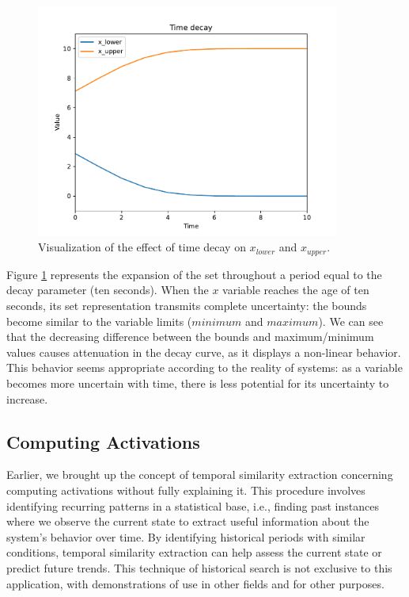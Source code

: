 \begin{figure}[h!]
    \centering
    \includegraphics[width=10cm]{figures/chapter4/cell/time_decay.pdf}
    \caption{Visualization of the effect of time decay on $x_{lower}$ and $x_{upper}$.}
    \label{fig:timedecay}
\end{figure}

Figure \ref{fig:timedecay} represents the expansion of the set throughout a period equal to the decay parameter (ten seconds). When the $x$ variable reaches the age of ten seconds, its set representation transmits complete uncertainty: the bounds become similar to the variable limits ($minimum$ and $maximum$). We can see that the decreasing difference between the bounds and maximum/minimum values causes attenuation in the decay curve, as it displays a non-linear behavior. This behavior seems appropriate according to the reality of systems: as a variable becomes more uncertain with time, there is less potential for its uncertainty to increase.


\subsection{Computing Activations} \label{subsec:tempsim}

Earlier, we brought up the concept of temporal similarity extraction concerning computing activations without fully explaining it. This procedure involves identifying recurring patterns in a statistical base, i.e., finding past instances where we observe the current state to extract useful information about the system's behavior over time. By identifying historical periods with similar conditions, temporal similarity extraction can help assess the current state or predict future trends. This technique of historical search is not exclusive to this application, with demonstrations of use in other fields and for other purposes.

